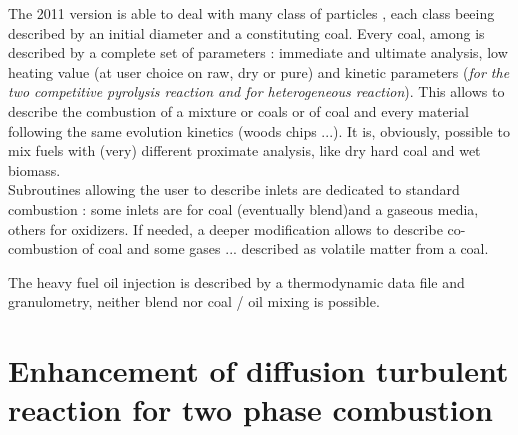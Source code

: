 The 2011 version is able to deal with many class of particles , each
class beeing described by an initial diameter and a constituting coal.  Every
coal, among  is described by a complete set of parameters :
immediate and ultimate analysis, low heating value (at user choice on raw, dry
or pure) and kinetic parameters ({\em for the two competitive pyrolysis reaction
  and for heterogeneous reaction}). This allows to describe the combustion of a
mixture or coals or of coal and every material following the same evolution
kinetics (woods chips ...). It is, obviously, possible to mix fuels with (very)
different proximate analysis, like dry hard coal and wet biomass.\\
Subroutines allowing the user to describe inlets are dedicated to standard
combustion : some inlets are for coal (eventually blend)and a gaseous media,
others for oxidizers. If needed, a deeper modification allows to describe
co-combustion of coal and some gases ... described as volatile matter from a
coal.

The heavy fuel oil injection is described by a thermodynamic data file and
granulometry, neither blend nor coal / oil mixing is possible.

\section[Diffusion turbulent reaction]{Enhancement of diffusion turbulent reaction for two phase combustion}

